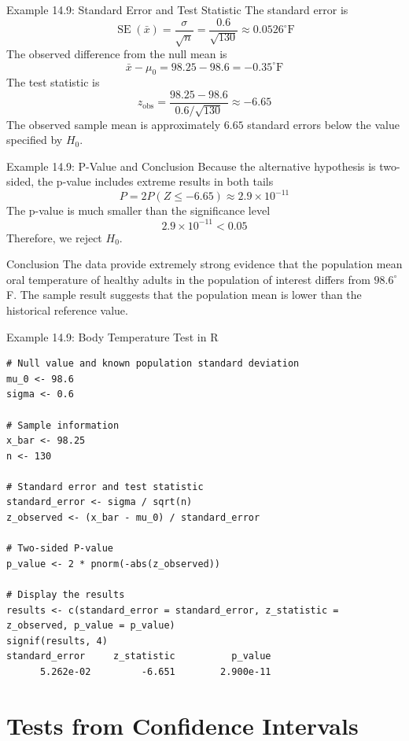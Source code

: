 \documentclass[aspectratio=169]{beamer}
\begin{document}
\begin{frame}{Example 14.9: Standard Error and Test Statistic}
The standard error is
$$\operatorname{SE}(\bar{x})=\frac{\sigma}{\sqrt{n}}=\frac{0.6}{\sqrt{130}}\approx0.0526^\circ\text{F}$$
The observed difference from the null mean is
$$\bar{x}-\mu_0=98.25-98.6=-0.35^\circ\text{F}$$
The test statistic is
$$z_{\mathrm{obs}}=\frac{98.25-98.6}{0.6/\sqrt{130}}\approx-6.65$$
The observed sample mean is approximately $6.65$ standard errors below the value specified by $H_0$.
\end{frame}

\begin{frame}{Example 14.9: P-Value and Conclusion}
Because the alternative hypothesis is two-sided, the p-value includes extreme results in both tails
$$P=2P(Z\leq-6.65)\approx2.9\times10^{-11}$$
The p-value is much smaller than the significance level
$$2.9\times10^{-11}<0.05$$
Therefore, we reject $H_0$.

\begin{block}{Conclusion}
The data provide extremely strong evidence that the population mean oral temperature of healthy adults in the population of interest differs from $98.6^\circ$F. The sample result suggests that the population mean is lower than the historical reference value.
\end{block}
\end{frame}

\begin{frame}[fragile]{Example 14.9: Body Temperature Test in R}
\scriptsize
\begin{verbatim}
# Null value and known population standard deviation
mu_0 <- 98.6
sigma <- 0.6

# Sample information
x_bar <- 98.25
n <- 130

# Standard error and test statistic
standard_error <- sigma / sqrt(n)
z_observed <- (x_bar - mu_0) / standard_error

# Two-sided P-value
p_value <- 2 * pnorm(-abs(z_observed))

# Display the results
results <- c(standard_error = standard_error, z_statistic = z_observed, p_value = p_value)
signif(results, 4)
standard_error     z_statistic          p_value
      5.262e-02         -6.651        2.900e-11
\end{verbatim}
\end{frame}

\section{Tests from Confidence Intervals}
\end{document}

